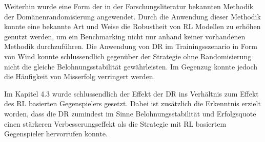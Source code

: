 Weiterhin wurde eine Form der in der Forschungsliteratur bekannten Methodik der Domänenrandomisierung angewendet. 
Durch die Anwendung dieser Methodik konnte eine bekannte Art und Weise die Robustheit von RL Modellen zu erhöhen genutzt werden, um ein Benchmarking nicht nur anhand keiner vorhandenen Methodik durchzuführen.
Die Anwendung von DR im Trainingsszenario in Form von Wind konnte schlussendlich gegenüber der Strategie ohne Randomisierung nicht die gleiche Belohnungsstabilität gewährleisten.
Im Gegenzug konnte jedoch die Häufigkeit von Misserfolg verringert werden.

Im Kapitel 4.3 wurde schlussendlich der Effekt der DR ins Verhältnis zum Effekt des RL basierten Gegenspielers gesetzt.
Dabei ist zusätzlich die Erkenntnis erzielt worden, dass die DR zumindest im Sinne Belohnungsstabilität und Erfolgsquote einen stärkeren Verbesserungseffekt als die Strategie mit RL basiertem Gegenspieler hervorrufen konnte.